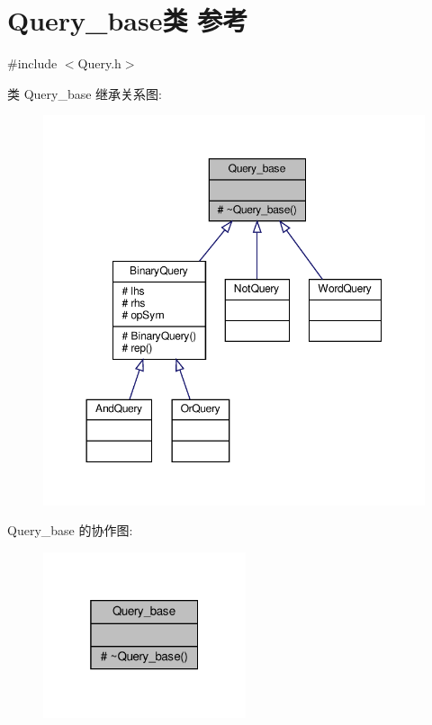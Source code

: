 \hypertarget{classQuery__base}{}\section{Query\+\_\+base类 参考}
\label{classQuery__base}


{\ttfamily \#include $<$Query.\+h$>$}



类 Query\+\_\+base 继承关系图\+:\nopagebreak
\begin{figure}[H]
\begin{center}
\leavevmode
\includegraphics[width=350pt]{classQuery__base__inherit__graph}
\end{center}
\end{figure}


Query\+\_\+base 的协作图\+:\nopagebreak
\begin{figure}[H]
\begin{center}
\leavevmode
\includegraphics[width=169pt]{classQuery__base__coll__graph}
\end{center}
\end{figure}
